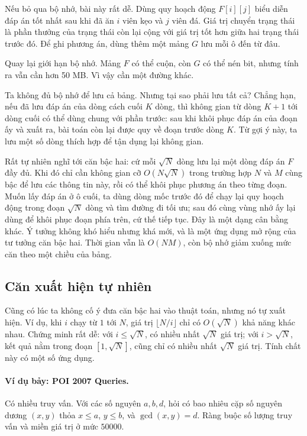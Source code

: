 \documentclass[11pt]{article}
\begin{document}
Nếu bỏ qua bộ nhớ, bài này rất dễ. Dùng quy hoạch động \(F[i][j]\) biểu diễn
đáp án tốt nhất sau khi đã ăn \(i\) viên kẹo và \(j\) viên đá. Giá trị chuyển
trạng thái là phần thưởng của trạng thái còn lại cộng với giá trị tốt hơn giữa
hai trạng thái trước đó. Để ghi phương án, dùng thêm một mảng \(G\) lưu mỗi ô
đến từ đâu.

Quay lại giới hạn bộ nhớ. Mảng \(F\) có thể cuộn, còn \(G\) có thể nén bit,
nhưng tính ra vẫn cần hơn 50 MB. Vì vậy cần một đường khác.

Ta không đủ bộ nhớ để lưu cả bảng. Nhưng tại sao phải lưu tất cả? Chẳng hạn,
nếu đã lưu đáp án của dòng cách cuối \(K\) dòng, thì không gian từ dòng
\(K+1\) tới dòng cuối có thể dùng chung với phần trước: sau khi khôi phục đáp
án của đoạn ấy và xuất ra, bài toán còn lại được quy về đoạn trước dòng \(K\).
Từ gợi ý này, ta lưu một số dòng thích hợp để tận dụng lại không gian.

Rất tự nhiên nghĩ tới căn bậc hai: cứ mỗi \(\sqrt N\) dòng lưu lại một dòng
đáp án \(F\) đầy đủ. Khi đó chỉ cần không gian cỡ \(O(N\sqrt N)\) trong trường
hợp \(N\) và \(M\) cùng bậc để lưu các thông tin này, rồi có thể khôi phục
phương án theo từng đoạn. Muốn lấy đáp án ở ô cuối, ta dùng dòng mốc trước đó
để chạy lại quy hoạch động trong đoạn \(\sqrt N\) dòng và tìm đường đi tối ưu;
sau đó cùng vùng nhớ ấy lại dùng để khôi phục đoạn phía trên, cứ thế tiếp tục.
Đây là một dạng cân bằng khác. Ý tưởng không khó hiểu nhưng khá mới, và là một
ứng dụng mở rộng của tư tưởng căn bậc hai. Thời gian vẫn là \(O(NM)\), còn bộ
nhớ giảm xuống mức căn theo một chiều của bảng.

\subsection{Căn xuất hiện tự nhiên}

Cũng có lúc ta không cố ý đưa căn bậc hai vào thuật toán, nhưng nó tự xuất
hiện. Ví dụ, khi \(i\) chạy từ \(1\) tới \(N\), giá trị
\(\lfloor N/i\rfloor\) chỉ có \(O(\sqrt N)\) khả năng khác nhau. Chứng minh rất
dễ: với \(i\le\sqrt N\), có nhiều nhất \(\sqrt N\) giá trị; với
\(i>\sqrt N\), kết quả nằm trong đoạn \([1,\sqrt N]\), cũng chỉ có nhiều nhất
\(\sqrt N\) giá trị. Tính chất này có một số ứng dụng.

\paragraph{Ví dụ bảy: POI 2007 Queries.}
Có nhiều truy vấn. Với các số nguyên \(a,b,d\), hỏi có bao nhiêu cặp số nguyên
dương \((x,y)\) thỏa \(x\le a\), \(y\le b\), và \(\gcd(x,y)=d\). Ràng buộc số
lượng truy vấn và miền giá trị ở mức \(50000\).
\end{document}

